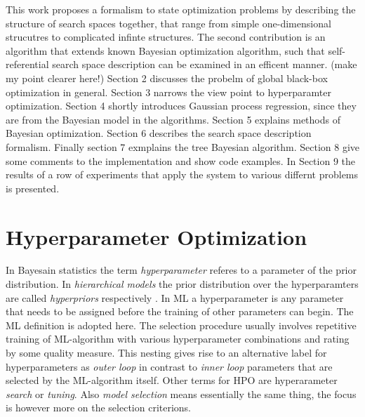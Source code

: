 \documentclass[english]{article}
\begin{document}
This work proposes a formalism to state optimization problems by describing the structure of search spaces together, that range from simple one-dimensional strucutres to complicated infinte structures. The second contribution is an algorithm that extends known Bayesian optimization algorithm, such that self-referential search space description can be examined in an efficent manner.
(make my point clearer here!)
Section 2 discusses the probelm of global black-box optimization in general. Section 3 narrows the view point to hyperparamter optimization.
Section 4 shortly introduces Gaussian process regression, since they are from the Bayesian model in the algorithms.
Section 5 explains methods of Bayesian optimization.
Section 6 describes the search space description formalism.
Finally section 7 exmplains the tree Bayesian algorithm.
Section 8 give some comments to the implementation and show code examples.
In Section 9 the results of a row of experiments that apply the system to various differnt problems is presented.

\newpage

\section{Hyperparameter Optimization}
In Bayesain statistics the term \textit{hyperparameter} referes to a parameter of the prior distribution. In \textit{hierarchical models} the prior distribution over the hyperparamters are called \textit{hyperpriors} respectively \cite[p.408]{bishop_neural_1995}. In \acf{ML} a hyperparameter is any parameter that needs to be assigned before the training of other parameters can begin. The \ac{ML} definition is adopted here. The selection procedure usually involves repetitive training of \ac{ML}-algorithm with various hyperparameter combinations and rating by some quality measure. This nesting gives rise to an alternative label for hyperparameters as \textit{outer loop} in contrast to \textit{inner loop} parameters that are selected by the \ac{ML}-algorithm itself. Other terms for \ac{HPO} are hyperarameter \textit{search} or \textit{tuning}.
Also \textit{model selection} means essentially the same thing, the focus is however more on the selection criterions.
\end{document}
